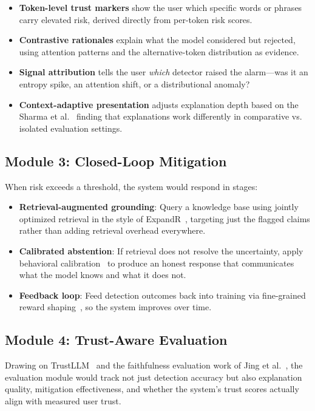 \documentclass[journal]{IEEEtran}
\begin{document}
\begin{itemize}
\item \textbf{Token-level trust markers} show the user which specific words or phrases carry elevated risk, derived directly from per-token risk scores.
\item \textbf{Contrastive rationales} explain what the model considered but rejected, using attention patterns and the alternative-token distribution as evidence.
\item \textbf{Signal attribution} tells the user \emph{which} detector raised the alarm---was it an entropy spike, an attention shift, or a distributional anomaly?
\item \textbf{Context-adaptive presentation} adjusts explanation depth based on the Sharma et al.~\cite{human_trust} finding that explanations work differently in comparative vs. isolated evaluation settings.
\end{itemize}

\subsection{Module 3: Closed-Loop Mitigation}

When risk exceeds a threshold, the system would respond in stages:

\begin{itemize}
\item \textbf{Retrieval-augmented grounding}: Query a knowledge base using jointly optimized retrieval in the style of ExpandR~\cite{expandr}, targeting just the flagged claims rather than adding retrieval overhead everywhere.
\item \textbf{Calibrated abstention}: If retrieval does not resolve the uncertainty, apply behavioral calibration~\cite{calibrated_rl} to produce an honest response that communicates what the model knows and what it does not.
\item \textbf{Feedback loop}: Feed detection outcomes back into training via fine-grained reward shaping~\cite{entropy_spike, calibrated_rl}, so the system improves over time.
\end{itemize}

\subsection{Module 4: Trust-Aware Evaluation}

Drawing on TrustLLM~\cite{trustllm} and the faithfulness evaluation work of Jing et al.~\cite{faithfulness}, the evaluation module would track not just detection accuracy but also explanation quality, mitigation effectiveness, and whether the system's trust scores actually align with measured user trust.
\end{document}
